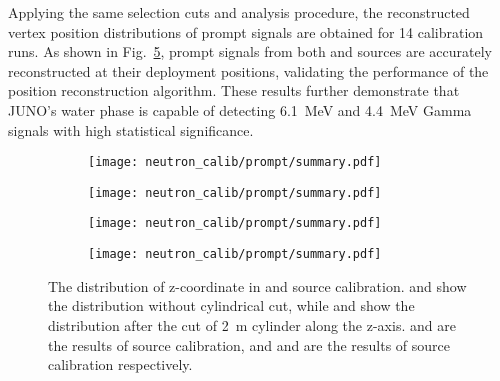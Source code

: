 Applying the same selection cuts and analysis procedure, the reconstructed vertex position distributions of prompt signals are obtained for 14 calibration runs.
As shown in Fig.~\ref{fig:promptSummary}, prompt signals from both  and  sources are accurately reconstructed at their deployment positions, validating the performance of the position reconstruction algorithm.
These results further demonstrate that JUNO's water phase is capable of detecting \SI{6.1}{MeV} and \SI{4.4}{MeV} Gamma signals with high statistical significance.
\begin{figure}[h]
	\centering
	\begin{subfigure}{0.5\textwidth}
		\centering
		\texttt{[image: neutron\_calib/prompt/summary.pdf]}
		\caption{}
		\label{fig:AmC_all}
	\end{subfigure}%
	\begin{subfigure}{0.5\textwidth}
		\centering
		\texttt{[image: neutron\_calib/prompt/summary.pdf]}
		\caption{}
		\label{fig:AmC_2m}
	\end{subfigure}
	\begin{subfigure}{0.5\textwidth}
		\centering
		\texttt{[image: neutron\_calib/prompt/summary.pdf]}
		\caption{}
		\label{fig:AmBe_all}
	\end{subfigure}%
	\begin{subfigure}{0.5\textwidth}
		\centering
		\texttt{[image: neutron\_calib/prompt/summary.pdf]}
		\caption{}
		\label{fig:AmBe_2m}
	\end{subfigure}
	\caption{The distribution of z-coordinate in  and  source calibration.  and  show the distribution without cylindrical cut, while  and  show the distribution after the cut of \SI{2}{m} cylinder along the z-axis.  and  are the results of  source calibration, and  and  are the results of  source calibration respectively.}
	\label{fig:promptSummary}
\end{figure}

